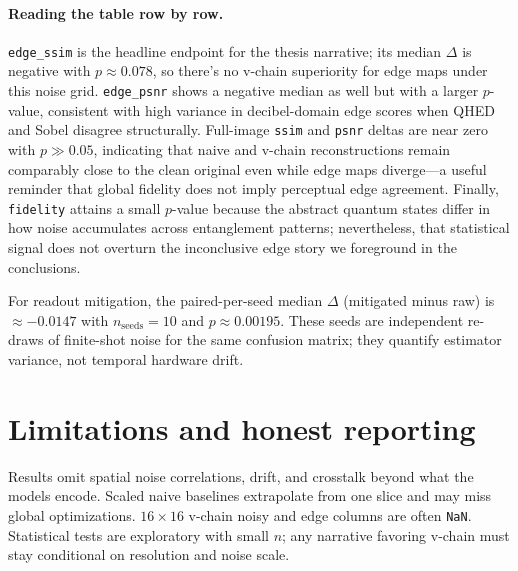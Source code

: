 \paragraph{Reading the table row by row.}
\texttt{edge\_ssim} is the headline endpoint for the thesis narrative; its median $\Delta$ is negative with $p\approx 0.078$, so there's no v-chain superiority for edge maps under this noise grid. \texttt{edge\_psnr} shows a negative median as well but with a larger $p$-value, consistent with high variance in decibel-domain edge scores when QHED and Sobel disagree structurally. Full-image \texttt{ssim} and \texttt{psnr} deltas are near zero with $p\gg 0.05$, indicating that naive and v-chain reconstructions remain comparably close to the clean original even while edge maps diverge---a useful reminder that global fidelity does not imply perceptual edge agreement. Finally, \texttt{fidelity} attains a small $p$-value because the abstract quantum states differ in how noise accumulates across entanglement patterns; nevertheless, that statistical signal does not overturn the inconclusive edge story we foreground in the conclusions.

For readout mitigation, the paired-per-seed median $\Delta$ (mitigated minus raw) is $\approx -0.0147$ with $n_{\mathrm{seeds}}=10$ and $p\approx 0.00195$. These seeds are independent re-draws of finite-shot noise for the same confusion matrix; they quantify estimator variance, not temporal hardware drift.
\FloatBarrier

\section{Limitations and honest reporting}
Results omit spatial noise correlations, drift, and crosstalk beyond what the models encode. Scaled naive baselines extrapolate from one slice and may miss global optimizations. $16\times 16$ v-chain noisy and edge columns are often \texttt{NaN}. Statistical tests are exploratory with small $n$; any narrative favoring v-chain must stay conditional on resolution and noise scale.
